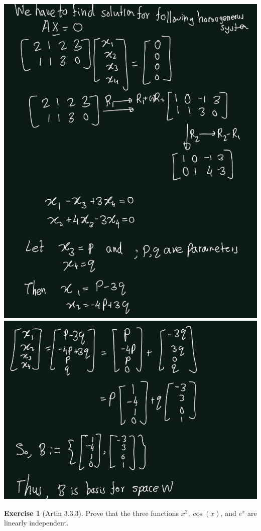\documentclass[
]{book}
\theoremstyle{definition}
\theoremstyle{definition}
\theoremstyle{definition}
\newtheorem{exercise}{Exercise}[chapter]
\theoremstyle{definition}
\theoremstyle{remark}
\begin{document}
\includegraphics{figures/ch_3/ex-3.2-1.png}
\includegraphics{figures/ch_3/ex-3.2-2.png}

\begin{exercise}[Artin 3.3.3]
\protect\hypertarget{exr:unnamed-chunk-289}{}\label{exr:unnamed-chunk-289}Prove that the three functions \(x^2, \cos(x)\), and \(e^x\) are linearly independent.
\end{exercise}
\end{document}
